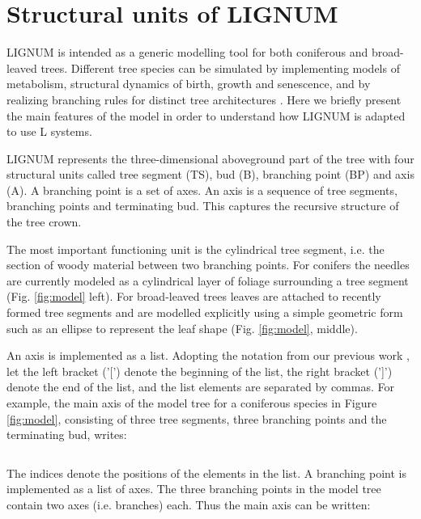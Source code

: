 \section{Structural units  of LIGNUM} 

LIGNUM is intended as a generic modelling tool for both coniferous and
broad-leaved  trees.   Different  tree  species can  be  simulated  by
implementing  models  of  metabolism,  structural dynamics  of  birth,
growth and  senescence, and by realizing branching  rules for distinct
tree   architectures  \citep{perttunen:96,  perttunen:01}.    Here  we
briefly present the main features  of the model in order to understand
how LIGNUM is adapted to use L systems.

LIGNUM represents  the three-dimensional aboveground part  of the tree
with  four  structural  units  called  tree  segment  (TS),  bud  (B),
branching point  (BP) and  axis (A).   A branching point  is a  set of
axes. An  axis is  a sequence of  tree segments, branching  points and
terminating bud.   This captures the  recursive structure of  the tree
crown.

The most  important functioning unit is the  cylindrical tree segment,
i.e. the section of woody  material between two branching points.  For
conifers the needles  are currently modeled as a  cylindrical layer of
foliage surrounding a tree  segment (Fig.  \ref{fig:model} left).  For
broad-leaved  trees  leaves  are  attached  to  recently  formed  tree
segments  and are modelled  explicitly using  a simple  geometric form
such as an ellipse to  represent the leaf shape (Fig. \ref{fig:model},
middle).

An  axis is implemented  as a  list.  Adopting  the notation  from our
previous work \citet{perttunen:96}, let  the left bracket ('[') denote
the beginning of  the list, the right bracket (']')  denote the end of
the list, and the list  elements are separated by commas. For example,
the main  axis of the  model tree for  a coniferous species  in Figure
\ref{fig:model},  consisting of three  tree segments,  three branching
points and the terminating bud, writes:

\begin{equation}
[TS_0,BP_1,TS_2,BP_3,TS_4,BP_5,B_6]
\end{equation}

The  indices denote  the positions  of the  elements in  the  list.  A
branching point is implemented as a list of axes.  The three branching
points in the model tree  contain two axes (i.e.  branches) each. Thus
the main axis can be written:

